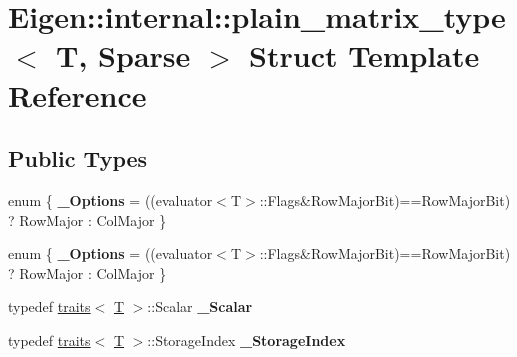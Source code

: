 \hypertarget{struct_eigen_1_1internal_1_1plain__matrix__type_3_01_t_00_01_sparse_01_4}{}\section{Eigen\+:\+:internal\+:\+:plain\+\_\+matrix\+\_\+type$<$ T, Sparse $>$ Struct Template Reference}
\label{struct_eigen_1_1internal_1_1plain__matrix__type_3_01_t_00_01_sparse_01_4}
\subsection*{Public Types}
\begin{DoxyCompactItemize}
\item 
\mbox{\label{struct_eigen_1_1internal_1_1plain__matrix__type_3_01_t_00_01_sparse_01_4_a500b708a5743ebb9cc436b350126b664}} 
enum \{ {\bfseries \+\_\+\+Options} = ((evaluator$<$T$>$\+:\+:Flags\&Row\+Major\+Bit)==Row\+Major\+Bit) ? Row\+Major \+: Col\+Major
 \}
\item 
\mbox{\label{struct_eigen_1_1internal_1_1plain__matrix__type_3_01_t_00_01_sparse_01_4_a65554e801228bc12258c006ba759229d}} 
enum \{ {\bfseries \+\_\+\+Options} = ((evaluator$<$T$>$\+:\+:Flags\&Row\+Major\+Bit)==Row\+Major\+Bit) ? Row\+Major \+: Col\+Major
 \}
\item 
\mbox{\label{struct_eigen_1_1internal_1_1plain__matrix__type_3_01_t_00_01_sparse_01_4_a18510fea488fb8c93b18fcf63b0765a0}} 
typedef \hyperlink{struct_eigen_1_1internal_1_1traits}{traits}$<$ \hyperlink{group___sparse_core___module}{T} $>$\+::Scalar {\bfseries \+\_\+\+Scalar}
\item 
\mbox{\label{struct_eigen_1_1internal_1_1plain__matrix__type_3_01_t_00_01_sparse_01_4_adbc2fc3f639bed115439b45259050bb1}} 
typedef \hyperlink{struct_eigen_1_1internal_1_1traits}{traits}$<$ \hyperlink{group___sparse_core___module}{T} $>$\+::Storage\+Index {\bfseries \+\_\+\+Storage\+Index}
\item 

\end{DoxyCompactItemize}
